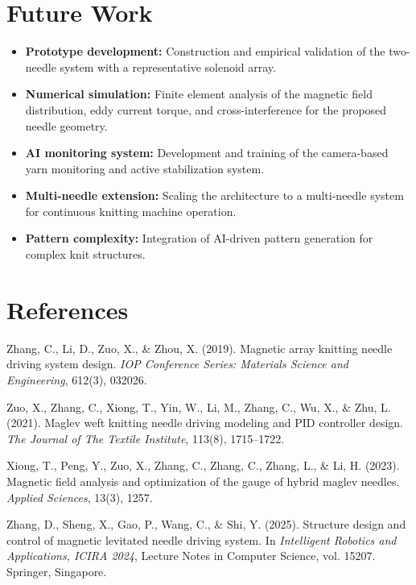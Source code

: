 \documentclass[10pt]{article}
\begin{document}
\section{Future Work}
\begin{itemize}
  \item \textbf{Prototype development:} Construction and empirical validation of the two-needle system with a representative solenoid array.
  \item \textbf{Numerical simulation:} Finite element analysis of the magnetic field distribution, eddy current torque, and cross-interference for the proposed needle geometry.
  \item \textbf{AI monitoring system:} Development and training of the camera-based yarn monitoring and active stabilization system.
  \item \textbf{Multi-needle extension:} Scaling the architecture to a multi-needle system for continuous knitting machine operation.
  \item \textbf{Pattern complexity:} Integration of AI-driven pattern generation for complex knit structures.
\end{itemize}

\section*{References}
\begin{enumerate}[label={[\arabic*]}, leftmargin=2em, itemsep=0.5em]
  \item Zhang, C., Li, D., Zuo, X., \& Zhou, X. (2019). Magnetic array knitting needle driving system design. \textit{IOP Conference Series: Materials Science and Engineering}, 612(3), 032026.
  \item Zuo, X., Zhang, C., Xiong, T., Yin, W., Li, M., Zhang, C., Wu, X., \& Zhu, L. (2021). Maglev weft knitting needle driving modeling and PID controller design. \textit{The Journal of The Textile Institute}, 113(8), 1715--1722.
  \item Xiong, T., Peng, Y., Zuo, X., Zhang, C., Zhang, C., Zhang, L., \& Li, H. (2023). Magnetic field analysis and optimization of the gauge of hybrid maglev needles. \textit{Applied Sciences}, 13(3), 1257.
  \item Zhang, D., Sheng, X., Gao, P., Wang, C., \& Shi, Y. (2025). Structure design and control of magnetic levitated needle driving system. In \textit{Intelligent Robotics and Applications, ICIRA 2024}, Lecture Notes in Computer Science, vol. 15207. Springer, Singapore.
\end{enumerate}
\end{document}
